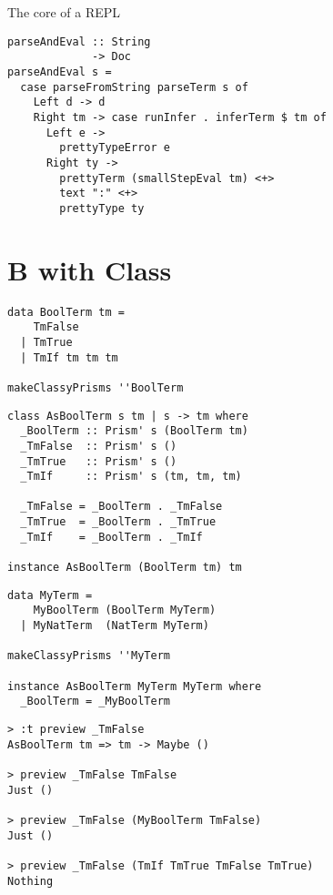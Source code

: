 \documentclass{beamer}
\begin{document}
\begin{frame}[fragile]
  \begin{center}
   The core of a REPL 
  \end{center}
  \begin{verbatim}
parseAndEval :: String
             -> Doc
parseAndEval s =
  case parseFromString parseTerm s of
    Left d -> d
    Right tm -> case runInfer . inferTerm $ tm of
      Left e -> 
        prettyTypeError e
      Right ty ->
        prettyTerm (smallStepEval tm) <+> 
        text ":" <+> 
        prettyType ty
  \end{verbatim}
\end{frame} 

\section{B with Class}

\begin{frame}[fragile]
  \begin{verbatim}
data BoolTerm tm =
    TmFalse
  | TmTrue
  | TmIf tm tm tm

makeClassyPrisms ''BoolTerm
  \end{verbatim}
\end{frame} 

\begin{frame}[fragile]
  \begin{verbatim}
class AsBoolTerm s tm | s -> tm where
  _BoolTerm :: Prism' s (BoolTerm tm)
  _TmFalse  :: Prism' s ()
  _TmTrue   :: Prism' s ()
  _TmIf     :: Prism' s (tm, tm, tm)

  _TmFalse = _BoolTerm . _TmFalse
  _TmTrue  = _BoolTerm . _TmTrue
  _TmIf    = _BoolTerm . _TmIf

instance AsBoolTerm (BoolTerm tm) tm
  \end{verbatim}
\end{frame} 

\begin{frame}[fragile]
  \begin{verbatim}
data MyTerm =
    MyBoolTerm (BoolTerm MyTerm)
  | MyNatTerm  (NatTerm MyTerm)

makeClassyPrisms ''MyTerm

instance AsBoolTerm MyTerm MyTerm where
  _BoolTerm = _MyBoolTerm
  \end{verbatim}
\end{frame} 

\begin{frame}[fragile]
  \begin{verbatim}
> :t preview _TmFalse
AsBoolTerm tm => tm -> Maybe ()

> preview _TmFalse TmFalse
Just ()

> preview _TmFalse (MyBoolTerm TmFalse)
Just ()

> preview _TmFalse (TmIf TmTrue TmFalse TmTrue)
Nothing
  \end{verbatim}
\end{frame} 
\end{document}
